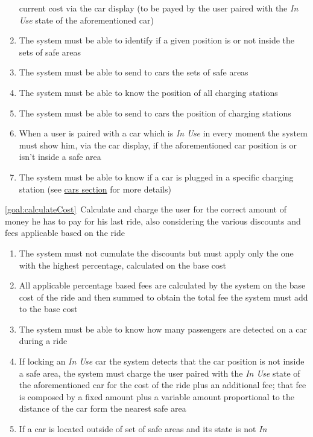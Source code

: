 \begin{description}
\begin{enumerate}[resume*]
  				current cost via the car display (to be payed by the user paired with the \emph{In Use}
  				state of the aforementioned car) 
  				\item The system must be able to identify if a given position is or not inside the sets
  				of safe areas
  				\item The system must be able to send to cars the sets of safe areas
  				\item The system must be able to know the position of all charging stations
  				\item The system must be able to send to cars the position of charging stations
  				\item When a user is paired with a car which is \emph{In Use} in every moment the
  				system must show him, via the car display, if the aforementioned car position is or
  				isn't inside a safe area
  				\item The system must be able to know if a car is plugged in a specific charging
  				station (see \hyperref[sec:cars]{cars section} for more details)
   			\end{enumerate}
  		\item \ref{goal:calculateCost}\ Calculate and charge the user for the correct amount of money he has to pay for his last ride, also considering the various discounts and fees applicable based on the ride
  			\begin{enumerate}[resume*]
  			    \item The system must not cumulate the discounts but must apply only the one with
  			    the highest percentage, calculated on the base cost
  			    \item All applicable percentage based fees are calculated by the system on the base cost of the ride and then summed to obtain the total fee the system must add to the base cost
  			    \item The system must be able to know how many passengers are detected on a car
  			    during a ride	
  				\item If locking an \emph{In Use} car the system detects that the car position is not
  				inside a safe area, the system must charge the user paired with the \emph{In Use}
  				state of the aforementioned car for the cost of the ride plus an additional fee; that fee
  				is composed by a fixed amount plus a variable amount proportional to the distance of
  				the car form the nearest safe area
  				\item If a car is located outside of set of safe areas and its state is not \emph{In
}
\end{enumerate}
\end{description}
